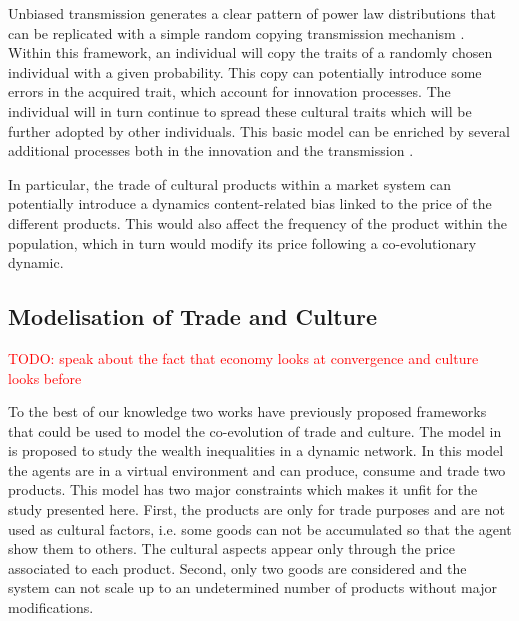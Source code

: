 \documentclass{wscpaperproc}
\newcommand{\memo}[2]{\textcolor{#1}{#2}}
\newcommand{\todo}[1]{\memo{red}{TODO: #1\\}}
\begin{document}
Unbiased transmission generates a clear pattern of power law distributions that can be replicated with a simple random copying transmission mechanism \cite{bentley_random_2004}. Within this framework, an individual will copy the traits of a randomly chosen individual with a given probability. This copy can potentially introduce some errors in the acquired trait, which account for innovation processes. The individual will in turn continue to spread these cultural traits which will be further adopted by other individuals. This basic model can be enriched by several additional processes both in the innovation \cite{schillinger_copying_2014,sole_evolutionary_2013,ziman_technological_2003} and the transmission \cite{heyes_social_1994,henrich_evolution_2003}.

In particular, the trade of cultural products within a market system can potentially introduce a dynamics content-related bias linked to the price of the different products. This would also affect the frequency of the product within the population, which in turn would modify its price following a co-evolutionary dynamic.

\subsection{Modelisation of Trade and Culture}

\todo{speak about the fact that economy looks at convergence and culture looks before}

To the best of our knowledge two works have previously proposed frameworks that could be used to model the co-evolution of trade and culture. The model in~\cite{bentley_specialisation_2005} is proposed to study the wealth inequalities in a dynamic network. In this model the agents are in a virtual environment and can produce, consume and trade two products. This model has two major constraints which makes it unfit for the study presented here. First, the products are only for trade purposes and are not used as cultural factors, i.e. some goods can not be accumulated so that the agent show them to others. The cultural aspects appear only through the price associated to each product. Second, only two goods are considered and the system can not scale up to an undetermined number of products without major modifications.
\end{document}
